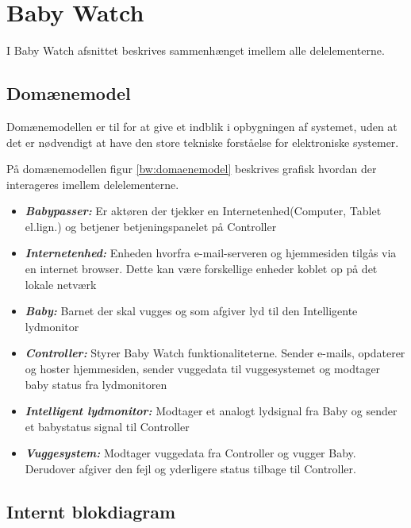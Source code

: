 \chapter{Baby Watch}

I Baby Watch afsnittet beskrives sammenhænget imellem alle delelementerne.

\section{Domænemodel}

Domænemodellen er til for at give et indblik i opbygningen af systemet, uden at det er nødvendigt at have den store tekniske forståelse for elektroniske systemer.


På domænemodellen figur \ref{bw:domaenemodel} beskrives grafisk hvordan der interageres imellem delelementerne. 

\begin{itemize}
\item \textbf{\textit{Babypasser:}}
Er aktøren der tjekker en Internetenhed(Computer, Tablet el.lign.) og betjener betjeningspanelet på Controller 
\item \textbf{\textit{Internetenhed:}}
Enheden hvorfra e-mail-serveren og hjemmesiden tilgås via en internet browser. Dette kan være forskellige enheder koblet op på det lokale netværk
\item \textbf{\textit{Baby:}}
Barnet der skal vugges og som afgiver lyd til den Intelligente lydmonitor
\item \textbf{\textit{Controller:}}
Styrer Baby Watch funktionaliteterne. Sender e-mails, opdaterer og hoster hjemmesiden, sender vuggedata til vuggesystemet og modtager baby status fra lydmonitoren
\item \textbf{\textit{Intelligent lydmonitor:}}
Modtager et analogt lydsignal fra Baby og sender et babystatus signal til Controller
\item \textbf{\textit{Vuggesystem:}}
Modtager vuggedata fra Controller og vugger Baby. Derudover afgiver den fejl og yderligere status tilbage til Controller.
\end{itemize}

\section{Internt blokdiagram}

